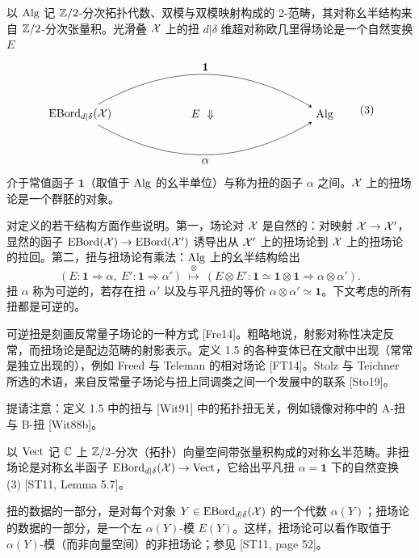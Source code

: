 \begin{definition}[{1.5（[ST11, Definition 5.2] 之略述）}]
以 $\operatorname{Alg}$ 记 $\mathbb{Z}/2$-分次拓扑代数、双模与双模映射构成的 2-范畴，其对称幺半结构来自 $\mathbb{Z}/2$-分次张量积。光滑叠 $\mathcal{X}$ 上的扭 $d|\delta$ 维超对称欧几里得场论是一个自然变换 $E$
\begin{equation}
\begin{tikzpicture}[baseline=(current bounding box.center), >=stealth]
  \node (A) at (0,0) {$\EBord_{d|\delta}(\cX)$};
  \node (C) at (7.6,0) {$\Alg$};
  \draw[->] (A) to[bend left=30] node[above] {$\mathbf 1$} (C);
  \draw[->] (A) to[bend right=30] node[below] {$\alpha$} (C);
  \node at (3.8,0) {$E\ \Downarrow$};
\end{tikzpicture}
\tag{3}
\end{equation}
介于常值函子 $\mathbf 1$（取值于 $\operatorname{Alg}$ 的幺半单位）与称为扭的函子 $\alpha$ 之间。$\mathcal{X}$ 上的扭场论是一个群胚的对象。
\end{definition}

对定义的若干结构方面作些说明。第一，场论对 $\mathcal{X}$ 是自然的：对映射 $\mathcal{X}\to\mathcal{X}'$，显然的函子 $\operatorname{EBord}(\mathcal{X})\to\operatorname{EBord}(\mathcal{X}')$ 诱导出从 $\mathcal{X}'$ 上的扭场论到 $\mathcal{X}$ 上的扭场论的拉回。第二，扭与扭场论有乘法：$\operatorname{Alg}$ 上的幺半结构给出
\[
(E\colon\mathbf 1\Rightarrow\alpha,\ E'\colon\mathbf 1\Rightarrow\alpha')\ \overset{\otimes}{\longmapsto}\ (E\otimes E'\colon\mathbf 1\simeq\mathbf 1\otimes\mathbf 1\Rightarrow\alpha\otimes\alpha').
\]
扭 $\alpha$ 称为可逆的，若存在扭 $\alpha'$ 以及与平凡扭的等价 $\alpha\otimes\alpha'\simeq\mathbf 1$。下文考虑的所有扭都是可逆的。

可逆扭是刻画反常量子场论的一种方式 [Fre14]。粗略地说，射影对称性决定反常，而扭场论是配边范畴的射影表示。定义 1.5 的各种变体已在文献中出现（常常是独立出现的），例如 Freed 与 Teleman 的相对场论 [FT14]。Stolz 与 Teichner 所选的术语，来自反常量子场论与扭上同调类之间一个发展中的联系 [Sto19]。

\begin{remark}[1.6]
提请注意：定义 1.5 中的扭与 [Wit91] 中的拓扑扭无关，例如镜像对称中的 A-扭与 B-扭 [Wit88b]。
\end{remark}

\begin{example}[1.7（非扭场论）]
以 $\operatorname{Vect}$ 记 $\mathbb{C}$ 上 $\mathbb{Z}/2$-分次（拓扑）向量空间带张量积构成的对称幺半范畴。非扭场论是对称幺半函子 $\operatorname{EBord}_{d|\delta}(\mathcal{X})\to\operatorname{Vect}$，它给出平凡扭 $\alpha=\mathbf 1$ 下的自然变换 (3) [ST11, Lemma 5.7]。

扭的数据的一部分，是对每个对象 $Y\in\operatorname{EBord}_{d|\delta}(\mathcal{X})$ 的一个代数 $\alpha(Y)$；扭场论的数据的一部分，是一个左 $\alpha(Y)$-模 $E(Y)$。这样，扭场论可以看作取值于 $\alpha(Y)$-模（而非向量空间）的非扭场论；参见 [ST11, page 52]。
\end{example}

